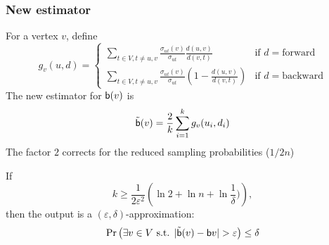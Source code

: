 \begin{frame}
  \frametitle{New estimator}
  For a vertex $v$, define
  \[
    g_v(u,d)=\left\{\begin{array}{ll}
        \sum_{t\in V,t\neq u,v} \frac{\sigma_{ut}(v)}{\sigma_{ut}}\frac{d(u,v)}{d(v,t)}
        & \text{if } d=\text{forward}\\
        \sum_{t\in V,t\neq u,v}
        \frac{\sigma_{ut}(v)}{\sigma_{ut}}\left(1-\frac{d(u,v)}{d(v,t)}\right)
        & \text{if } d=\text{backward}\end{array}\right.
  \]
  \pause
  The new estimator for $\mathsf{b}(v)$ is
  \[
    \tilde{\mathsf{b}}(v)=\frac{2}{k}\sum_{i=1}^k g_v(u_i,d_i)
  \]
  The factor $2$ corrects for the reduced sampling probabilities ($1/2n$)
  \pause
  \begin{theorem}
    If
    \[
      k\ge \frac{1}{2\varepsilon^2}\left(\ln 2 + \ln n + \ln
    \frac{1}{\delta})\right),
    \]
    then the output is a $(\varepsilon,\delta)$-approximation:
    \[
      \Pr\left(\exists v\in V \text{ s.t. }
      |\tilde{\betw}(v)-\betw{v}|>\varepsilon\right)\le \delta
    \]
    \vspace{-10pt}
  \end{theorem}
\end{frame}

